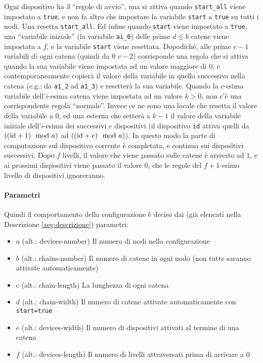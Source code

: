 \documentclass[12pt, a4paper]{article}
\begin{document}
Ogni dispositivo ha 3 ``regole di avvio'', una si attiva quando \lstinline{start_all} viene impostato a \lstinline{true}, e non fa altro che impostare la variabile \lstinline{start} a \lstinline{true} su tutti i nodi. Una resetta \lstinline{start_all}. Ed infine quando \lstinline{start} viene impostato a \lstinline{true}, una ``variabile iniziale'' (la variabile \lstinline{ai_0}) delle prime $d\leq b$ catene viene impostata a $f$, e la variabile \lstinline{start} viene resettata.
Dopodiché, alle prime $c-1$ variabili di ogni catena (quindi da $0$ $c-2$) corrisponde una regola che si attiva quando la sua variabile viene impostata ad un valore maggiore di $0$, e contemporaneamente copierà il valore della variabile in quella successiva nella catena (e.g.: da \lstinline{a1_2} ad \lstinline{a1_3}) e resetterà la sua variabile.
Quando la $c$-esima variabile dell'$i$-esima catena viene impostata ad un valore $k>0$, non c'è una corrispondente regola ``normale''. Invece ce ne sono una locale che resetta il valore della variabile a $0$, ed una esterna che setterà a $k-1$ il valore della variabile iniziale dell'$i$-esima dei successivi $e$ dispositivi (il dispositivo \lstinline{id} attiva quelli da $((\text{\lstinline{id}}+1)\mod a)$ ad $((\text{\lstinline{id}}+e)\mod a)$). In questo modo la parte di computazione sul dispositivo corrente è completata, e continua sui dispositivi successivi.
Dopo $f$ livelli, il valore che viene passato sulle catene è arrivato ad $1$, e ai prossimi dispositivi viene passato il valore $0$, che le regole del $f+1$-esimo livello di dispositivi ignoreranno.

\paragraph{Parametri}

Quindi il comportamento della configurazione è deciso dai (già elencati nella Descrizione \ref{aeg:descrizione}) parametri:
\begin{itemize}
    \item $a$ (alt.: devices-number) Il numero di nodi nella configurazione
    \item $b$ (alt.: chains-number) Il numero di catene in ogni nodo (non tutte saranno attivate automaticamente)
    \item $c$ (alt.: chain-length) La lunghezza di ogni catena
    \item $d$ (alt.: chain-width) Il numero di catene attivate automaticamente con \lstinline{start=true}
    \item $e$ (alt.: devices-width) Il numero di dispositivi attivati al termine di una catena
    \item $f$ (alt.: devices-length) Il numero di livelli attraversati prima di arrivare a $0$
\end{itemize}
\end{document}
